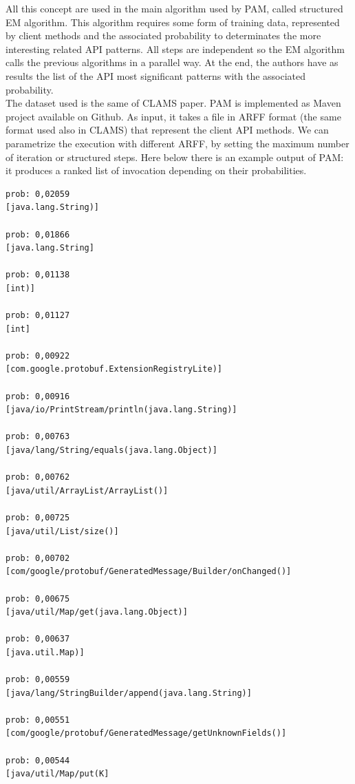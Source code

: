 All this concept are used in the main algorithm used by PAM, called structured EM algorithm. This algorithm requires some form of training data, represented by client methods and the associated probability to determinates the more interesting related API patterns. All steps are independent so the EM algorithm calls the previous algorithms in a parallel way. At the end, the authors have as results the list of the API most significant patterns with the associated probability. \\
The dataset used is the same of CLAMS paper. PAM is implemented as Maven project available on Github. As input, it takes a file in ARFF format (the same format used also in CLAMS) that represent the client API methods. We can parametrize the execution with different ARFF, by setting the maximum number of iteration or structured steps. Here below there is an example output of PAM: it produces a ranked list of invocation depending on their probabilities. 

\begin{lstlisting}
prob: 0,02059
[java.lang.String)]

prob: 0,01866
[java.lang.String]

prob: 0,01138
[int)]

prob: 0,01127
[int]

prob: 0,00922
[com.google.protobuf.ExtensionRegistryLite)]

prob: 0,00916
[java/io/PrintStream/println(java.lang.String)]

prob: 0,00763
[java/lang/String/equals(java.lang.Object)]

prob: 0,00762
[java/util/ArrayList/ArrayList()]

prob: 0,00725
[java/util/List/size()]

prob: 0,00702
[com/google/protobuf/GeneratedMessage/Builder/onChanged()]

prob: 0,00675
[java/util/Map/get(java.lang.Object)]

prob: 0,00637
[java.util.Map)]

prob: 0,00559
[java/lang/StringBuilder/append(java.lang.String)]

prob: 0,00551
[com/google/protobuf/GeneratedMessage/getUnknownFields()]

prob: 0,00544
[java/util/Map/put(K]

\end{lstlisting}


